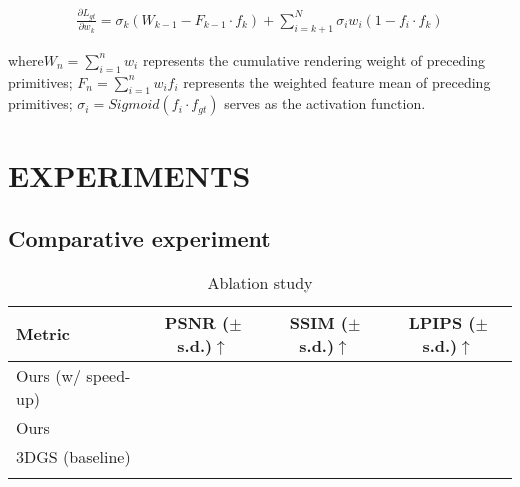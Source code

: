 \documentclass[numbers]{article}
\begin{document}
\begin{align*}
    \frac{\partial L_{gt}}{\partial w_k} = \sigma_k(W_{k-1}-F_{k-1}\cdot f_k) + \sum_{i=k+1}^{N}\sigma_i w_i(1 - f_i\cdot f_k)
\end{align*}

where\(W_n=\sum_{i=1}^{n}w_i\) represents the cumulative rendering weight of preceding primitives;
\(F_n=\sum_{i=1}^{n}w_i f_i\) represents the weighted feature mean of preceding primitives;
\(\sigma_i=Sigmoid\left( f_i \cdot f_{gt}\right)\) serves as the activation function.










\label{sec:method}

\section{EXPERIMENTS}
\subsection{Comparative experiment}

\begin{table}[!htbp]
\centering
\caption{Ablation study}
\renewcommand{\arraystretch}{1.25}
\begin{tabular}{l | c c c}
\Xhline{1.2pt}
Metric & PSNR ($\pm$ s.d.)$\uparrow$  & SSIM ($\pm$ s.d.)$\uparrow$ & LPIPS ($\pm$ s.d.)$\uparrow$   \\
\hline
Ours (w/ speed-up) &  &  &  \\
Ours &  &  &   \\
3DGS (baseline) &  &  &  \\
\Xhline{1.2pt}
\end{tabular}
\label{tab:ablation1}
\end{table}
\end{document}

